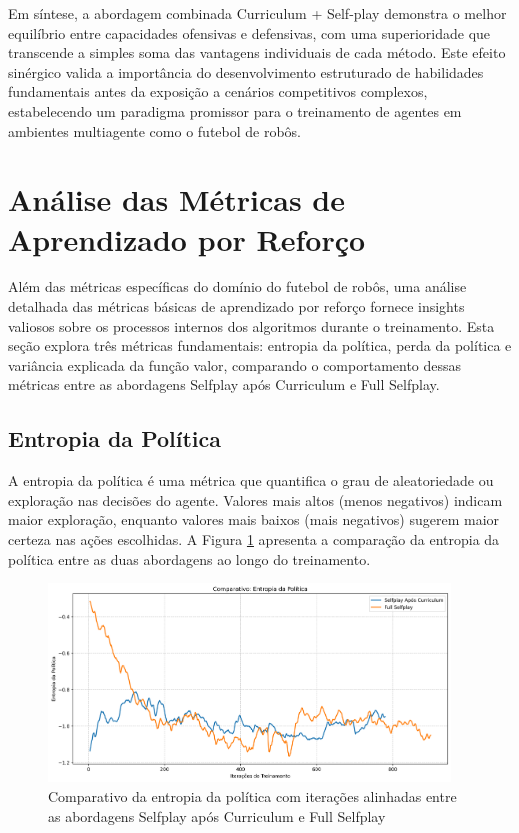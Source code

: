 Em síntese, a abordagem combinada Curriculum + Self-play demonstra o melhor equilíbrio entre capacidades ofensivas e defensivas, com uma superioridade que transcende a simples soma das vantagens individuais de cada método. Este efeito sinérgico valida a importância do desenvolvimento estruturado de habilidades fundamentais antes da exposição a cenários competitivos complexos, estabelecendo um paradigma promissor para o treinamento de agentes em ambientes multiagente como o futebol de robôs.

\section{Análise das Métricas de Aprendizado por Reforço}
\label{sec:analise_metricas_aprendizado}

Além das métricas específicas do domínio do futebol de robôs, uma análise detalhada das métricas básicas de aprendizado por reforço fornece insights valiosos sobre os processos internos dos algoritmos durante o treinamento. Esta seção explora três métricas fundamentais: entropia da política, perda da política e variância explicada da função valor, comparando o comportamento dessas métricas entre as abordagens Selfplay após Curriculum e Full Selfplay.

\subsection{Entropia da Política}

A entropia da política é uma métrica que quantifica o grau de aleatoriedade ou exploração nas decisões do agente. Valores mais altos (menos negativos) indicam maior exploração, enquanto valores mais baixos (mais negativos) sugerem maior certeza nas ações escolhidas. A Figura \ref{fig:policy_entropy} apresenta a comparação da entropia da política entre as duas abordagens ao longo do treinamento.

\begin{figure}[H]
    \centering
    \includegraphics[width=0.95\textwidth]{fig/graficos_trabalho/graficos_experimentos/geral/comparativo_entropia_politica.png}
    \caption{Comparativo da entropia da política com iterações alinhadas entre as abordagens Selfplay após Curriculum e Full Selfplay}
    \label{fig:policy_entropy}
\end{figure}

